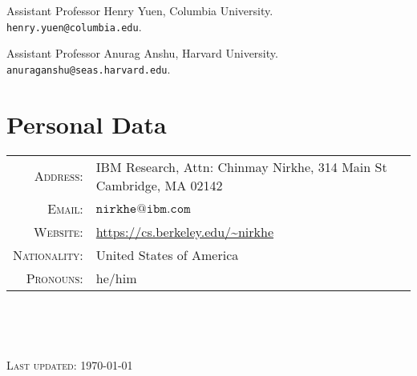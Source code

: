 \documentclass[11pt]{article}
\begin{document}
Assistant Professor Henry Yuen, Columbia University. \texttt{henry.yuen@columbia.edu}.

Assistant Professor Anurag Anshu, Harvard University. \texttt{anuraganshu@seas.harvard.edu}.

\section{Personal Data}

\begin{tabular}{rl}
    \textsc{Address:}     & IBM Research, Attn: Chinmay Nirkhe, 314 Main St Cambridge, MA 02142 \\
    \textsc{Email:}       & $\mathtt{nirkhe@ibm.com}$ \\
    \textsc{Website:}     & \url{https://cs.berkeley.edu/~nirkhe} \\
    \textsc{Nationality:} & United States of America \\
    \textsc{Pronouns:}    & he/him \\
\end{tabular}

\

\

\textsc{Last updated: \today}
\end{document}
